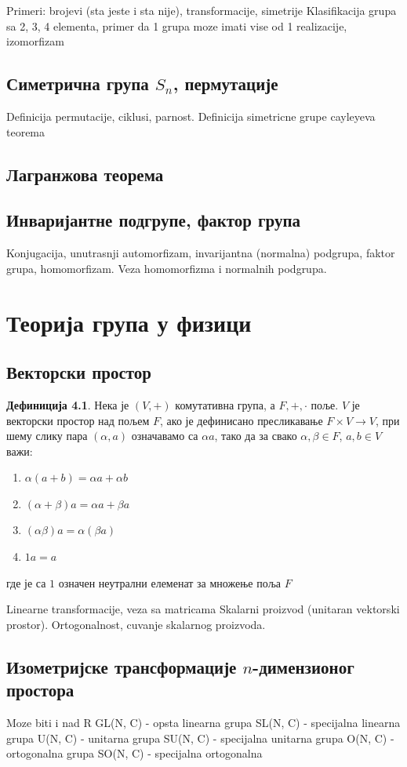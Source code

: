 \documentclass{report}
\theoremstyle{plain}
\theoremstyle{definition}
\newtheorem{defn}{Дефиниција}
\begin{document}
Primeri: brojevi (sta jeste i sta nije), transformacije, simetrije
Klasifikacija grupa sa 2, 3, 4 elementa, primer da 1 grupa moze imati vise od 1 realizacije, izomorfizam
\section{Симетрична група $S_n$, пермутације}
Definicija permutacije, ciklusi, parnost.
Definicija simetricne grupe
cayleyeva teorema
\section{Лагранжова теорема}
\section{Инваријантне подгрупе, фактор група}
Konjugacija, unutrasnji automorfizam, invarijantna (normalna) podgrupa, faktor grupa, homomorfizam.
Veza homomorfizma i normalnih podgrupa.

\chapter{Теорија група у физици}
\section{Векторски простор}
\begin{defn}
Нека је $(V, +)$ комутативна група, а $F, +, \cdot$ поље. $V$ је векторски простор над пољем $F$, ако је дефинисано пресликавање $F\times V\rightarrow V$, при шему слику пара $(\alpha, a)$ означавамо са $\alpha a$, тако да за свако $\alpha, \beta \in F$, $a, b\in V$ важи:
\begin{enumerate}
\item $\alpha(a+b) = \alpha a+\alpha b$
\item $(\alpha + \beta)a = \alpha a+ \beta a$
\item $(\alpha\beta)a = \alpha(\beta a)$
\item $1a = a$
\end{enumerate}
где је са $1$ означен неутрални елеменат за множење поља $F$
\end{defn}
Linearne transformacije, veza sa matricama
Skalarni proizvod (unitaran vektorski prostor).
Ortogonalnost, cuvanje skalarnog proizvoda.
\section{Изометријске трансформације $n$-димензионог простора}
Moze biti i nad R
GL(N, C) - opsta linearna grupa
SL(N, C) - specijalna linearna grupa
U(N, C) - unitarna grupa
SU(N, C) - specijalna unitarna grupa
O(N, C) - ortogonalna grupa
SO(N, C) - specijalna ortogonalna
\end{document}
